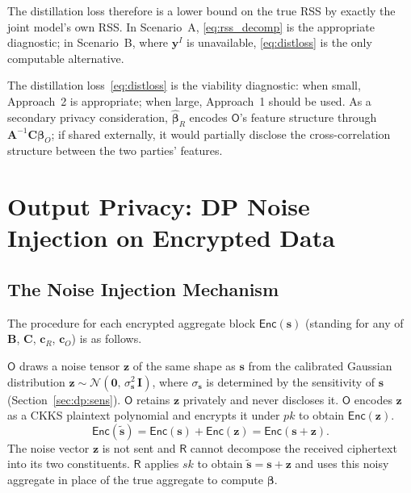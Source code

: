 \documentclass[12pt]{article}
\theoremstyle{definition}
\theoremstyle{plain}
\newcommand{\Enc}[1]{\mathsf{Enc}\!\left(#1\right)}
\newcommand{\by}{\mathbf{y}}
\newcommand{\bbeta}{\boldsymbol{\beta}}
\newcommand{\bA}{\mathbf{A}}
\newcommand{\bB}{\mathbf{B}}
\newcommand{\bC}{\mathbf{C}}
\newcommand{\bcR}{\mathbf{c}_{R}}
\newcommand{\bcO}{\mathbf{c}_{O}}
\newcommand{\Party}[1]{\textsf{#1}}
\newcommand{\pk}{\mathit{pk}}
\newcommand{\sk}{\mathit{sk}}
\begin{document}
The distillation loss therefore is a lower bound on the true RSS by
exactly the joint model's own RSS. In Scenario~A, \eqref{eq:rss_decomp} is the
appropriate diagnostic; in Scenario~B, where $\by^{I}$ is unavailable,
\eqref{eq:distloss} is the only computable alternative.

The distillation
loss~\eqref{eq:distloss} is the viability diagnostic: when small, Approach~2
is appropriate; when large, Approach~1 should be used. As a secondary
privacy consideration, $\hat{\bbeta}_{R}$ encodes $\Party{O}$'s feature
structure through $\bA^{-1}\bC\bbeta_{O}$; if shared externally, it would
partially disclose the cross-correlation structure between the two
parties' features.


\section{Output Privacy: DP Noise Injection on Encrypted Data}
\label{sec:dp}


\subsection{The Noise Injection Mechanism}
\label{sec:dp:mech}

The procedure for each encrypted aggregate block $\Enc{\mathbf{s}}$ (standing for any of $\bB$, $\bC$,
$\bcR$, $\bcO$) is as follows.

$\Party{O}$ draws a noise tensor $\mathbf{z}$ of the same shape as $\mathbf{s}$ from the calibrated Gaussian distribution $\mathbf{z} \sim \mathcal{N}(\mathbf{0},\, \sigma_{\mathbf{s}}^{2}\,\mathbf{I})$, where $\sigma_{\mathbf{s}}$ is determined by the sensitivity of $\mathbf{s}$ (Section~\ref{sec:dp:sens}). $\Party{O}$ retains $\mathbf{z}$ privately and never discloses it.
 $\Party{O}$ encodes $\mathbf{z}$ as a CKKS plaintext polynomial and encrypts it under $\pk$ to obtain $\Enc{\mathbf{z}}$.   \begin{equation}
    \Enc{\tilde{\mathbf{s}}} = \Enc{\mathbf{s}} + \Enc{\mathbf{z}} = \Enc{\mathbf{s} + \mathbf{z}}.
    \label{eq:noise_inject}
  \end{equation}
  The noise vector $\mathbf{z}$ is not sent and $\Party{R}$ cannot decompose the received ciphertext into its two constituents. $\Party{R}$ applies $\sk$ to obtain $\tilde{\mathbf{s}} = \mathbf{s} + \mathbf{z}$ and uses this noisy aggregate in place of the true aggregate to compute $\bbeta$.
\end{document}
